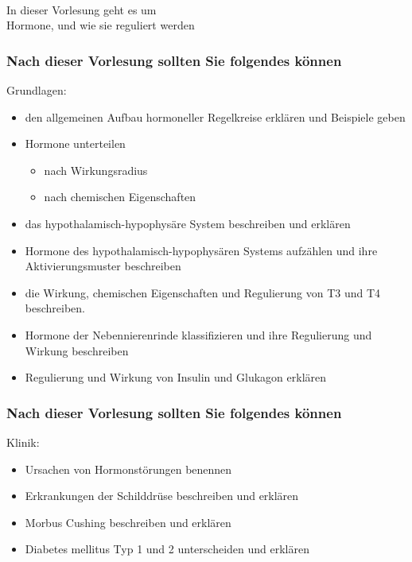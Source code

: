 \documentclass{beamer}
\begin{document}
{
\begin{frame}

$\,$\\[5cm]

\Large{In dieser Vorlesung geht es um \\Hormone, und wie sie reguliert werden}


\end{frame}
}


 
\begin{frame}

\frametitle{Nach dieser Vorlesung sollten Sie folgendes können}



\begin{block}{Grundlagen:}
\begin{itemize}
\item
den allgemeinen Aufbau hormoneller Regelkreise erklären und Beispiele geben
\item
Hormone unterteilen 
\begin{itemize}
\item
 nach Wirkungsradius
\item 
nach chemischen Eigenschaften
\end{itemize}
\item
das hypothalamisch-hypophysäre System beschreiben und erklären
\item
Hormone des hypothalamisch-hypophysären Systems aufzählen und ihre Aktivierungsmuster beschreiben
\item
die Wirkung, chemischen Eigenschaften und Regulierung von T3 und T4 beschreiben.
\item
Hormone der Nebennierenrinde klassifizieren und ihre Regulierung und Wirkung beschreiben 
\item
Regulierung und Wirkung von Insulin und Glukagon erklären

\end{itemize}

\end{block}


\end{frame}



\begin{frame}

\frametitle{Nach dieser Vorlesung sollten Sie folgendes können}


\begin{block}{Klinik:}
\begin{itemize}
\item
Ursachen von Hormonstörungen benennen
\item
 Erkrankungen der Schilddrüse beschreiben und erklären
\item
 Morbus Cushing beschreiben und erklären
\item
Diabetes mellitus Typ 1 und 2 unterscheiden und erklären 
\end{itemize}

\end{block}

\end{frame}
\end{document}
